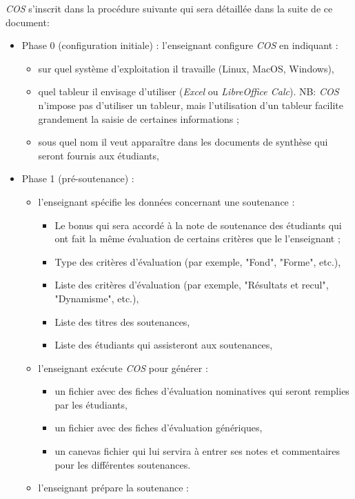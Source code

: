 \documentclass[11pt]{article}
\begin{document}
\emph{COS} s'inscrit dans la procédure suivante qui sera détaillée dans la
suite de ce document:
\begin{itemize}
\item Phase 0 (configuration initiale) : l'enseignant configure \emph{COS} en
indiquant :
\begin{itemize}
\item sur quel système d'exploitation il travaille (Linux, MacOS, Windows),
\item quel tableur il envisage d'utiliser (\emph{Excel} ou \emph{LibreOffice
Calc}). NB: \emph{COS} n'impose pas d'utiliser un tableur, mais
l'utilisation d'un tableur facilite grandement la saisie de
certaines informations ;
\item sous quel nom il veut apparaître dans les documents de synthèse qui
seront fournis aux étudiants,
\end{itemize}
\item Phase 1 (pré-soutenance) :
\begin{itemize}
\item l'enseignant spécifie les données concernant une soutenance :
\begin{itemize}
\item Le bonus qui sera accordé à la note de soutenance des étudiants
qui ont fait la même évaluation de certains critères que le
l'enseignant ;
\item Type des critères d'évaluation (par exemple, "Fond", "Forme", etc.),
\item Liste des critères d'évaluation (par exemple, "Résultats et
recul", "Dynamisme", etc.),
\item Liste des titres des soutenances,
\item Liste des étudiants qui assisteront aux soutenances,
\end{itemize}
\item l'enseignant exécute \emph{COS} pour générer :
\begin{itemize}
\item un fichier avec des fiches d'évaluation nominatives qui seront
remplies par les étudiants,
\item un fichier avec des fiches d'évaluation génériques,
\item un canevas fichier qui lui servira à entrer ses notes et
commentaires pour les différentes soutenances.
\end{itemize}
\item l'enseignant prépare la soutenance :
\begin{itemize}

\end{itemize}
\end{itemize}
\end{itemize}
\end{document}
